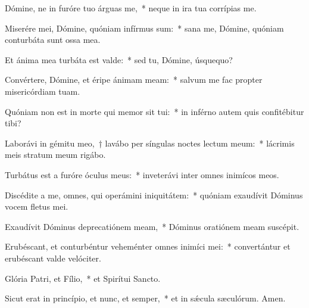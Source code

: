 \item Dómine, ne in furóre tuo árguas me,~* neque in ira tua corrípias me.

\item Miserére mei, Dómine, quóniam infírmus sum:~* sana me, Dómine, quóniam conturbáta sunt ossa mea.

\item Et ánima mea turbáta est valde:~* sed tu, Dómine, úsquequo?

\item Convértere, Dómine, et éripe ánimam meam:~* salvum me fac propter misericórdiam tuam.

\item Quóniam non est in morte qui memor sit tui:~* in inférno autem quis confitébitur tibi?

\item Laborávi in gémitu meo,~† lavábo per síngulas noctes lectum meum:~* lácrimis meis stratum meum rigábo.

\item Turbátus est a furóre óculus meus:~* inveterávi inter omnes inimícos meos.

\item Discédite a me, omnes, qui operámini iniquitátem:~* quóniam exaudívit Dóminus vocem fletus mei.

\item Exaudívit Dóminus deprecatiónem meam,~* Dóminus oratiónem meam suscépit.

\item Erubéscant, et conturbéntur veheménter omnes inimíci mei:~* convertántur et erubéscant valde velóciter.

\item Glória Patri, et Fílio,~* et Spirítui Sancto.

\item Sicut erat in princípio, et nunc, et semper,~* et in sǽcula sæculórum. Amen.

